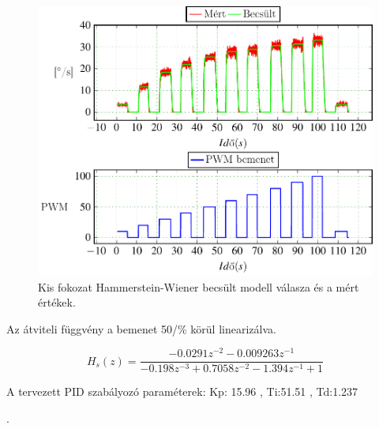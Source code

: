 \begin{figure}[H]
  \includegraphics{tikz/KFsysIdent.pdf}
  \caption{Kis fokozat Hammerstein-Wiener becsült modell válasza és a mért értékek.}
  \label{fig:KFsysIdent}
\end{figure}

Az átviteli függvény a bemenet 50/\% körül linearizálva.

\begin{equation}
    H_s(z)=\frac{-0.0291z^{-2} -0.009263z^{-1}}{-0.198z^{-3}+0.7058z^{-2} -1.394z^{-1} +1}
\end{equation}

A tervezett PID szabályozó paraméterek: Kp: 15.96 , Ti:51.51 , Td:1.237 

.
